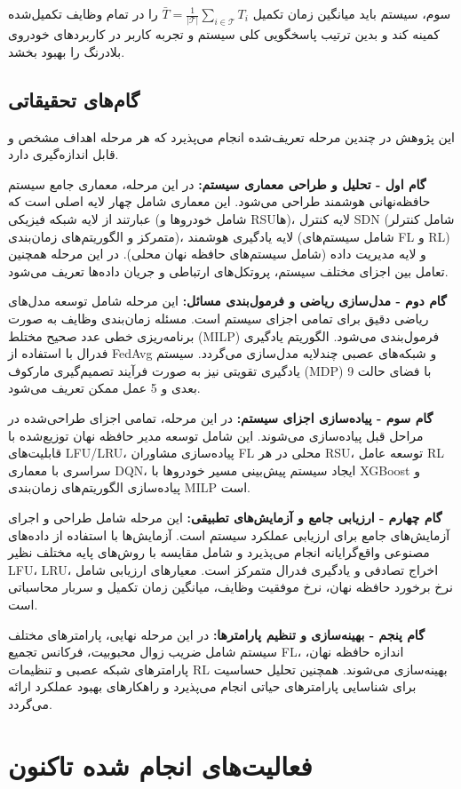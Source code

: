 \documentclass[11pt]{article}
\newcommand{\فصل}[1]{\section{#1}}
\newcommand{\قسمت}[1]{\subsection{#1}}
\begin{document}
سوم، سیستم باید میانگین زمان تکمیل $\bar{T} = \frac{1}{|\mathcal{T}|} \sum_{i \in \mathcal{T}} T_i$ را در تمام وظایف تکمیل‌شده کمینه کند و بدین ترتیب پاسخگویی کلی سیستم و تجربه کاربر در کاربردهای خودروی بلادرنگ را بهبود بخشد.

\قسمت{گام‌های تحقیقاتی}

این پژوهش در چندین مرحله تعریف‌شده انجام می‌پذیرد که هر مرحله اهداف مشخص و قابل اندازه‌گیری دارد.

\textbf{گام اول - تحلیل و طراحی معماری سیستم:} در این مرحله، معماری جامع سیستم حافظه‌نهانی هوشمند طراحی می‌شود. این معماری شامل چهار لایه اصلی است که عبارتند از لایه شبکه فیزیکی (شامل خودروها و RSUها)، لایه کنترل SDN (شامل کنترلر متمرکز و الگوریتم‌های زمان‌بندی)، لایه یادگیری هوشمند (شامل سیستم‌های FL و RL) و لایه مدیریت داده (شامل سیستم‌های حافظه نهان محلی). در این مرحله همچنین تعامل بین اجزای مختلف سیستم، پروتکل‌های ارتباطی و جریان داده‌ها تعریف می‌شود.

\textbf{گام دوم - مدل‌سازی ریاضی و فرمول‌بندی مسائل:} این مرحله شامل توسعه مدل‌های ریاضی دقیق برای تمامی اجزای سیستم است. مسئله زمان‌بندی وظایف به صورت برنامه‌ریزی خطی عدد صحیح مختلط (MILP) فرمول‌بندی می‌شود. الگوریتم یادگیری فدرال با استفاده از FedAvg و شبکه‌های عصبی چندلایه مدل‌سازی می‌گردد. سیستم یادگیری تقویتی نیز به صورت فرآیند تصمیم‌گیری مارکوف (MDP) با فضای حالت 9 بعدی و 5 عمل ممکن تعریف می‌شود.

\textbf{گام سوم - پیاده‌سازی اجزای سیستم:} در این مرحله، تمامی اجزای طراحی‌شده در مراحل قبل پیاده‌سازی می‌شوند. این شامل توسعه مدیر حافظه نهان توزیع‌شده با قابلیت‌های LFU/LRU، پیاده‌سازی مشاوران FL محلی در هر RSU، توسعه عامل RL سراسری با معماری DQN، ایجاد سیستم پیش‌بینی مسیر خودروها با XGBoost و پیاده‌سازی الگوریتم‌های زمان‌بندی MILP است.

\textbf{گام چهارم - ارزیابی جامع و آزمایش‌های تطبیقی:} این مرحله شامل طراحی و اجرای آزمایش‌های جامع برای ارزیابی عملکرد سیستم است. آزمایش‌ها با استفاده از داده‌های مصنوعی واقع‌گرایانه انجام می‌پذیرد و شامل مقایسه با روش‌های پایه مختلف نظیر LFU، LRU، اخراج تصادفی و یادگیری فدرال متمرکز است. معیارهای ارزیابی شامل نرخ برخورد حافظه نهان، نرخ موفقیت وظایف، میانگین زمان تکمیل و سربار محاسباتی است.

\textbf{گام پنجم - بهینه‌سازی و تنظیم پارامترها:} در این مرحله نهایی، پارامترهای مختلف سیستم شامل ضریب زوال محبوبیت، فرکانس تجمیع FL، اندازه حافظه نهان، پارامترهای شبکه عصبی و تنظیمات RL بهینه‌سازی می‌شوند. همچنین تحلیل حساسیت برای شناسایی پارامترهای حیاتی انجام می‌پذیرد و راهکارهای بهبود عملکرد ارائه می‌گردد.

\فصل{فعالیت‌های انجام شده تاکنون}
\end{document}
